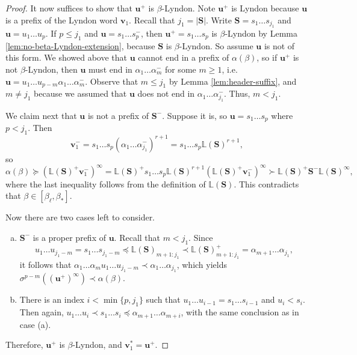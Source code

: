 \documentclass[11pt]{amsart}
\theoremstyle{definition}
\theoremstyle{remark}
\numberwithin{equation}{section}
\renewcommand{\L}{\ensuremath{\mathbb{L}}}
\newcommand{\s}{ {\mathbf{s}}}
\newcommand{\cs}{ {\mathbf{S}}}
\renewcommand{\u}{\mathbf{u}}
\renewcommand{\v}{\mathbf{v}}
\newcommand{\f}{\infty}
\newcommand{\al}{\alpha}
\newcommand{\lle}{\preccurlyeq}
\newcommand{\lge}{\succcurlyeq}
\newcommand{\si}{\sigma}
\begin{document}
\begin{proof}
It now suffices to show that $\u^+$ is $\beta$-Lyndon. Note $\u^+$ is Lyndon because $\u$ is a prefix of the Lyndon word $\v_1$.
Recall that $j_1=|\cs|$. Write $\cs=s_1\dots s_{j_1}$ and $\u=u_1\dots u_p$. If $p\leq j_1$ and $\u=s_1\dots s_p^-$, then $\u^+=s_1\dots s_p$ is $\beta$-Lyndon by Lemma \ref{lem:no-beta-Lyndon-extension}, because $\cs$ is $\beta$-Lyndon. So assume $\u$ is not of this form. We showed above that $\u$ cannot end in a prefix of $\al(\beta)$, so if $\u^+$ is not $\beta$-Lyndon, then $\u$ must end in $\al_1\dots\al_m^-$ for some $m\geq 1$, i.e. $\u=u_1\dots u_{p-m}\al_1\dots\al_m^-$. Observe that $m\leq j_1$ by Lemma \ref{lem:header-suffix}, and $m\neq j_1$ because we assumed that $\u$ does not end in $\al_1\dots\al_{j_1}^-$. Thus, $m<j_1$.

We claim next that $\u$ is not a prefix of $\cs^-$. Suppose it is, so $\u=s_1\dots s_p$ where $p<j_1$. Then
\[
\v_1^-=s_1\dots s_p(\al_1\dots\al_{j_1}^-)^{r+1}=s_1\dots s_p \L(\cs)^{r+1},
\]
so
\begin{equation*}
\al(\beta)\lge (\L(\cs)^+\v_1^-)^\f=\L(\cs)^+s_1\dots s_p \L(\cs)^{r+1}(\L(\cs)^+\v_1^-)^\f \succ \L(\cs)^+\cs^-\L(\cs)^\f,
\end{equation*}
where the last inequality follows from the definition of $\L(\cs)$. This contradicts that $\beta\in [\beta_\ell,\beta_*]$.

Now there are two cases left to consider.
\begin{enumerate}[(a)]
\item $\cs^-$ is a proper prefix of $\u$. Recall that $m<j_1$. Since
\[
u_1\dots u_{j_1-m}=s_1\dots s_{j_1-m}\lle \L(\cs)_{m+1:j_1}\prec \L(\cs)^+_{m+1:j_1}=\al_{m+1}\dots\al_{j_1},
\]
it follows that $\al_1\dots\al_m u_1\dots u_{j_1-m}\prec \al_1\dots\al_{j_1}$, which yields $\si^{p-m}((\u^+)^\f)\prec\al(\beta)$.
\item There is an index $i<\min\{p,j_1\}$ such that $u_1\dots u_{i-1}=s_1\dots s_{i-1}$ and $u_i<s_i$. Then again, $u_1\dots u_i\prec s_1\dots s_i\lle \al_{m+1}\dots \al_{m+i}$, with the same conclusion as in case (a).
\end{enumerate}
Therefore, $\u^+$ is $\beta$-Lyndon, and $\v_1^*=\u^+$.

\medskip


\end{proof}
\end{document}
